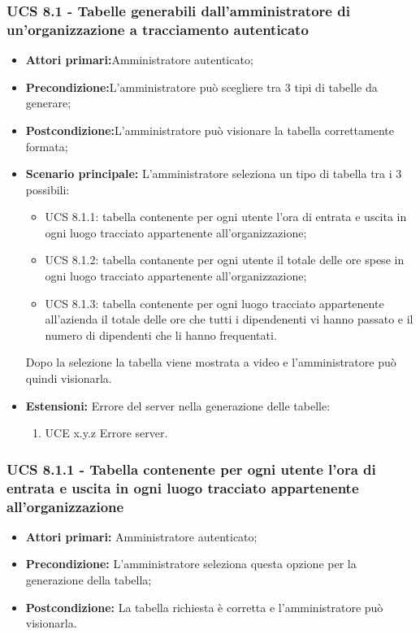 \subsubsection{UCS 8.1 - Tabelle generabili dall'amministratore di un'organizzazione a tracciamento autenticato}%
\begin{itemize}
\item \textbf{Attori primari:}Amministratore autenticato;
\item \textbf{Precondizione:}L'amministratore può scegliere tra 3 tipi di tabelle da generare;
\item \textbf{Postcondizione:}L'amministratore può visionare la tabella correttamente formata;
\item \textbf{Scenario principale:} L'amministratore seleziona un tipo di tabella tra i 3 possibili:
	\begin{itemize}%
	\item UCS 8.1.1: tabella contenente per ogni utente l'ora di entrata e uscita in ogni luogo tracciato appartenente all'organizzazione;
	\item UCS 8.1.2: tabella contanente per ogni utente il totale delle ore spese in ogni luogo tracciato appartenente all'organizzazione;
	\item UCS 8.1.3: tabella contenente per ogni luogo tracciato appartenente all'azienda il totale delle ore che tutti i dipendenenti vi hanno passato e il numero di dipendenti che li hanno frequentati.
\end{itemize}
Dopo la selezione la tabella viene mostrata a video e l'amministratore può quindi visionarla.
\item \textbf{Estensioni:} Errore del server nella generazione delle tabelle:
	\begin{enumerate}
		\item UCE x.y.z Errore server.
	\end{enumerate}
\end{itemize}

\subsubsection{UCS 8.1.1 - Tabella contenente per ogni utente l'ora di entrata e uscita in ogni luogo tracciato appartenente all'organizzazione}%
\begin{itemize}
\item \textbf{Attori primari:} Amministratore autenticato;
\item \textbf{Precondizione:} L'amministratore seleziona questa opzione per la generazione della tabella;
\item \textbf{Postcondizione:} La tabella richiesta è corretta e l'amministratore può visionarla.
\end{itemize}

